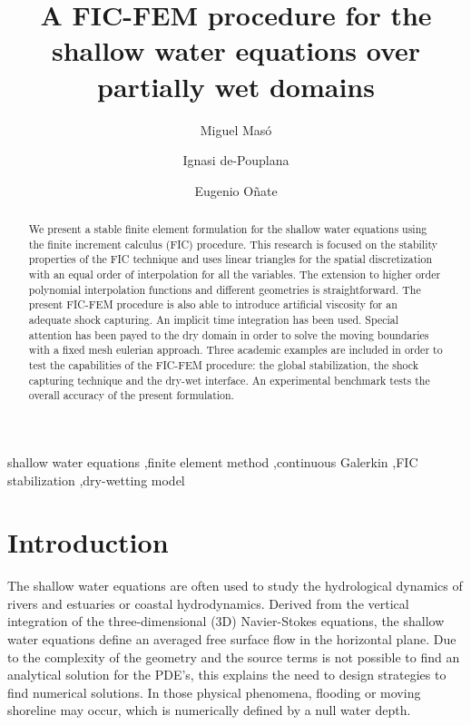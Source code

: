 \documentclass[a4paper,12pt]{elsarticle}
\begin{document}

\begin{frontmatter}
\title{A FIC-FEM procedure for the shallow water equations over partially wet domains}
\author[1,2]{Miguel Masó }
\author[1,2]{Ignasi de-Pouplana}
\author[1,2]{Eugenio Oñate}
\address[1]{Centre Int. de Mètodes Numèrics a l'Enginyeria (CIMNE), Barcelona, Spain}
\address[2]{Universitat Politècnica de Catalunya (UPC), Barcelona, Spain}

\begin{abstract}
We present a stable finite element formulation for the shallow water equations using the finite increment calculus (FIC) procedure.
This research is focused on the stability properties of the FIC technique and uses linear triangles for the spatial discretization with an equal order of interpolation for all the variables.
The extension to higher order polynomial interpolation functions and different geometries is straightforward.
The present FIC-FEM procedure is also able to introduce artificial viscosity for an adequate shock capturing.
An implicit time integration has been used. Special attention has been payed to the dry domain in order to solve the moving boundaries with a fixed mesh eulerian approach.
Three academic examples are included in order to test the capabilities of the FIC-FEM procedure: the global stabilization, the shock capturing technique and the dry-wet interface.
An experimental benchmark tests the overall accuracy of the present formulation.
\end{abstract}

\begin{keyword}
shallow water equations \sep finite element method \sep continuous Galerkin \sep FIC stabilization \sep dry-wetting model
\end{keyword}
\end{frontmatter}



\section{Introduction}
\label{sec:introduction}


The shallow water equations are often used to study the hydrological dynamics of rivers and estuaries or coastal hydrodynamics.
Derived from the vertical integration of the three-dimensional (3D) Navier-Stokes equations, the shallow water equations define an averaged free surface flow in the horizontal plane.
Due to the complexity of the geometry and the source terms is not possible to find an analytical solution for the PDE's, this explains the need to design strategies to find numerical solutions.
In those physical phenomena, flooding or moving shoreline may occur, which is numerically defined by a null water depth.
\end{document}
